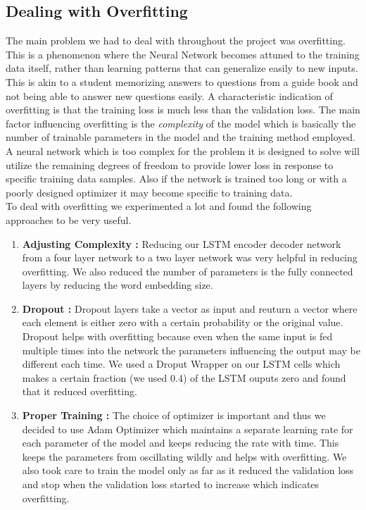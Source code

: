 \documentclass[12pt]{article}
\begin{document}
\subsection{Dealing with Overfitting}

The main problem we had to deal with throughout the project was overfitting. This is a phenomenon where the Neural Network becomes attuned to the training data itself, rather than learning patterns that can generalize easily to new inputs. This is akin to a student memorizing answers to questions from a guide book and not being able to answer new questions easily. A characteristic indication of overfitting is that the training loss is much less than the validation loss. The main factor influencing overfitting is the \textit{complexity} of the model which is basically the number of trainable parameters in the model and the training method employed. A neural network which is too complex for the problem it is designed to solve will utilize the remaining degrees of freedom to provide lower loss in response to specific training data samples. Also if the network is trained too long or with a poorly designed optimizer it may become specific to training data.\\

To deal with overfitting we experimented a lot and found the following approaches to be very useful. 
\begin{enumerate}
\item \textbf{Adjusting Complexity :} Reducing our LSTM encoder decoder network from a four layer network to a two layer network was very helpful in reducing overfitting. We also reduced the number of parameters is the fully connected layers by reducing the word embedding size.  
\item \textbf{Dropout :} Dropout layers take a vector as input and reuturn a vector where each element is either zero with a certain probability or the original value. Dropout helps with overfitting because even  when the same input is fed multiple times into the network the parameters influencing the output may be different each time. We used a Droput Wrapper on our LSTM cells which makes a certain fraction (we used 0.4) of the LSTM ouputs zero and found that it reduced overfitting.
\item \textbf{Proper Training :} The choice of optimizer is important and thus we decided to use Adam Optimizer which maintains a separate learning rate for each parameter of the model and keeps reducing the rate with time. This keeps the parameters from oscillating wildly and helps with overfitting. We also took care to train the model only as far as it reduced the validation loss and stop when the validation loss started to increase which indicates overfitting.

\end{enumerate}
\end{document}
